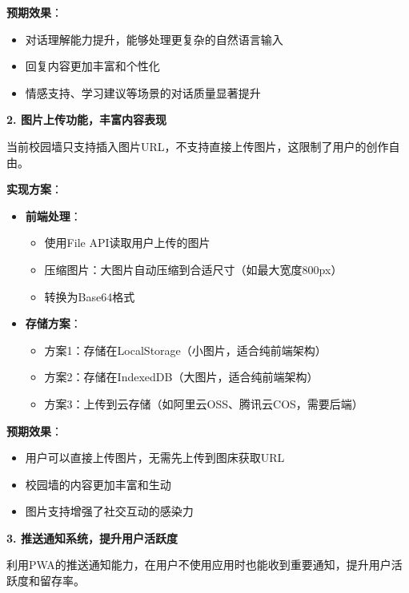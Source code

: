 \documentclass[12pt,a4paper]{article}
\begin{document}
\textbf{预期效果}：
\begin{itemize}
    \item 对话理解能力提升，能够处理更复杂的自然语言输入
    \item 回复内容更加丰富和个性化
    \item 情感支持、学习建议等场景的对话质量显著提升
\end{itemize}

\textbf{2. 图片上传功能，丰富内容表现}

当前校园墙只支持插入图片URL，不支持直接上传图片，这限制了用户的创作自由。

\textbf{实现方案}：
\begin{itemize}
    \item \textbf{前端处理}：
        \begin{itemize}
            \item 使用File API读取用户上传的图片
            \item 压缩图片：大图片自动压缩到合适尺寸（如最大宽度800px）
            \item 转换为Base64格式
        \end{itemize}
    \item \textbf{存储方案}：
        \begin{itemize}
            \item 方案1：存储在LocalStorage（小图片，适合纯前端架构）
            \item 方案2：存储在IndexedDB（大图片，适合纯前端架构）
            \item 方案3：上传到云存储（如阿里云OSS、腾讯云COS，需要后端）
        \end{itemize}
\end{itemize}

\textbf{预期效果}：
\begin{itemize}
    \item 用户可以直接上传图片，无需先上传到图床获取URL
    \item 校园墙的内容更加丰富和生动
    \item 图片支持增强了社交互动的感染力
\end{itemize}

\textbf{3. 推送通知系统，提升用户活跃度}

利用PWA的推送通知能力，在用户不使用应用时也能收到重要通知，提升用户活跃度和留存率。
\end{document}
